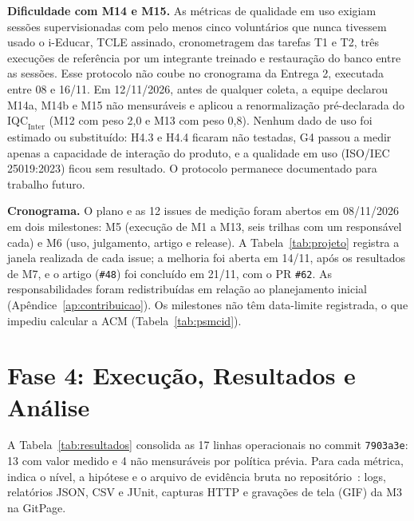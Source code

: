 \documentclass[conference]{model/IEEEtran}%
\begin{document}
\textbf{Dificuldade com M14 e M15.} As métricas de qualidade em uso exigiam sessões supervisionadas com pelo menos cinco voluntários que nunca tivessem usado o i-Educar, TCLE assinado, cronometragem das tarefas T1 e T2, três execuções de referência por um integrante treinado e restauração do banco entre as sessões. Esse protocolo não coube no cronograma da Entrega 2, executada entre 08 e 16/11. Em 12/11/2026, antes de qualquer coleta, a equipe declarou M14a, M14b e M15 não mensuráveis e aplicou a renormalização pré-declarada do $\text{IQC}_{\text{Inter}}$ (M12 com peso 2,0 e M13 com peso 0,8). Nenhum dado de uso foi estimado ou substituído: H4.3 e H4.4 ficaram não testadas, G4 passou a medir apenas a capacidade de interação do produto, e a qualidade em uso (ISO/IEC 25019:2023) ficou sem resultado. O protocolo permanece documentado para trabalho futuro.

\textbf{Cronograma.} O plano e as 12 issues de medição foram abertos em 08/11/2026 em dois milestones: M5 (execução de M1 a M13, seis trilhas com um responsável cada) e M6 (uso, julgamento, artigo e release). A Tabela~\ref{tab:projeto} registra a janela realizada de cada issue; a melhoria foi aberta em 14/11, após os resultados de M7, e o artigo (\texttt{\#48}) foi concluído em 21/11, com o PR \texttt{\#62}. As responsabilidades foram redistribuídas em relação ao planejamento inicial (Apêndice~\ref{ap:contribuicao}). Os milestones não têm data-limite registrada, o que impediu calcular a ACM (Tabela~\ref{tab:psmcid}).

\section{Fase 4: Execução, Resultados e Análise}\label{sec:fase4}

A Tabela~\ref{tab:resultados} consolida as 17 linhas operacionais no commit \texttt{7903a3e}: 13 com valor medido e 4 não mensuráveis por política prévia. Para cada métrica, indica o nível, a hipótese e o arquivo de evidência bruta no repositório~\cite{repo_gracehopper}: logs, relatórios JSON, CSV e JUnit, capturas HTTP e gravações de tela (GIF) da M3 na GitPage.
\end{document}
